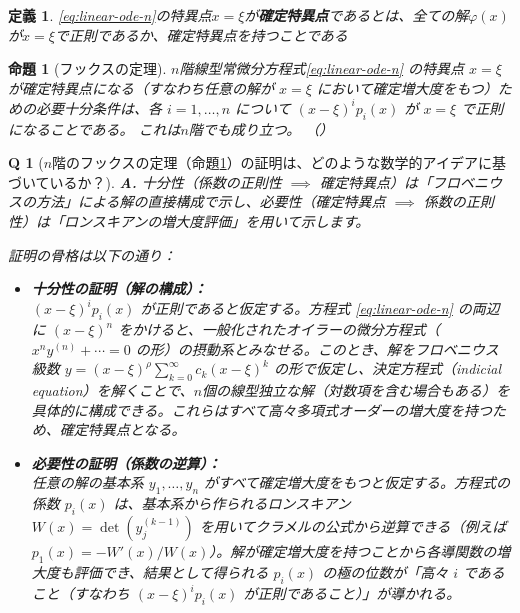 \documentclass[paper=a4, fontsize=11pt]{jlreq} %
\theoremstyle{break}
\newtheorem{definition}[theorem]{定義}
\newtheorem{proposition}[theorem]{命題}
\theoremstyle{qa}
\newtheorem*{Q}{Q}
\theoremstyle{remark} %
\begin{document}
\begin{definition}
    \eqref{eq:linear-ode-n}の特異点$x=\xi$が\textbf{確定特異点}であるとは、全ての解$\varphi(x)$が$x=\xi$で正則であるか、確定特異点を持つことである
\end{definition}

\begin{proposition}[フックスの定理]\label{prop:fuchs_theorem_n}
    $n$階線型常微分方程式\eqref{eq:linear-ode-n}
    の特異点 $x=\xi$ が確定特異点になる（すなわち任意の解が $x=\xi$ において確定増大度をもつ）ための必要十分条件は、各 $i=1,\dots,n$ について $(x-\xi)^{i}p_{i}(x)$ が $x=\xi$ で正則になることである。
    これは$n$階でも成り立つ。
    （\cite[定理13.4 p.128]{book:takano}）
\end{proposition}

\begin{Q}[$n$階のフックスの定理（命題\ref{prop:fuchs_theorem_n}）の証明は、どのような数学的アイデアに基づいているか？]
\textbf{A.} 十分性（係数の正則性 $\implies$ 確定特異点）は「フロベニウスの方法」による解の直接構成で示し、必要性（確定特異点 $\implies$ 係数の正則性）は「ロンスキアンの増大度評価」を用いて示します。

証明の骨格は以下の通り：
\begin{itemize}
    \item \textbf{十分性の証明（解の構成）：}\\
    $(x-\xi)^{i}p_{i}(x)$ が正則であると仮定する。方程式 \eqref{eq:linear-ode-n} の両辺に $(x-\xi)^n$ をかけると、一般化されたオイラーの微分方程式（$x^n y^{(n)} + \cdots = 0$ の形）の摂動系とみなせる。このとき、解をフロベニウス級数 $y = (x-\xi)^{\rho} \sum_{k=0}^{\infty} c_k (x-\xi)^k$ の形で仮定し、決定方程式（indicial equation）を解くことで、$n$個の線型独立な解（対数項を含む場合もある）を具体的に構成できる。これらはすべて高々多項式オーダーの増大度を持つため、確定特異点となる。

    \item \textbf{必要性の証明（係数の逆算）：}\\
    任意の解の基本系 $y_1, \dots, y_n$ がすべて確定増大度をもつと仮定する。方程式の係数 $p_i(x)$ は、基本系から作られるロンスキアン $W(x) = \det(y_j^{(k-1)})$ を用いてクラメルの公式から逆算できる（例えば $p_1(x) = -W'(x)/W(x)$）。解が確定増大度を持つことから各導関数の増大度も評価でき、結果として得られる $p_i(x)$ の極の位数が「高々 $i$ であること（すなわち $(x-\xi)^i p_i(x)$ が正則であること）」が導かれる。
\end{itemize}
\end{Q}
\end{document}
